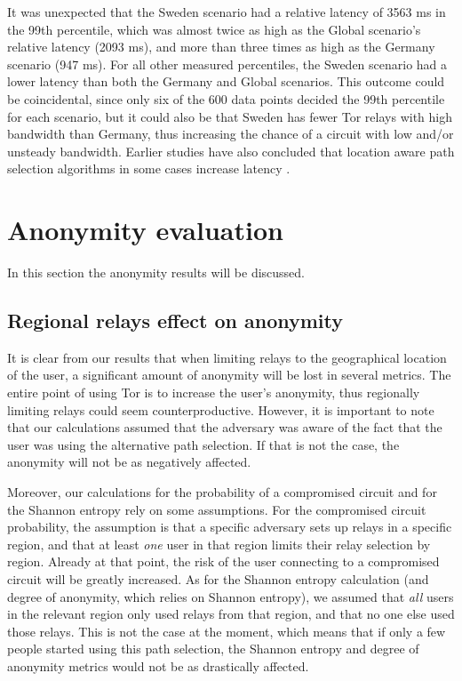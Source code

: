 \documentclass{kththesis}
\begin{document}
It was unexpected that the Sweden scenario had a relative latency of 3563 ms in the 99th percentile, which was almost twice as high as the Global scenario's relative latency (2093 ms), and more than three times as high as the Germany scenario (947 ms). For all other measured percentiles, the Sweden scenario had a lower latency than both the Germany and Global scenarios. This outcome could be coincidental, since only six of the 600 data points decided the 99th percentile for each scenario, but it could also be that Sweden has fewer Tor relays with high bandwidth than Germany, thus increasing the chance of a circuit with low and/or unsteady bandwidth. Earlier studies have also concluded that location aware path selection algorithms in some cases increase latency \parencite{CLAPS}.
 
\section{Anonymity evaluation}
\label{section:anonymityEvaluation}
In this section the anonymity results will be discussed.

\subsection{Regional relays effect on anonymity}
It is clear from our results that when limiting relays to the geographical location of the user, a significant amount of anonymity will be lost in several metrics. The entire point of using Tor is to increase the user's anonymity, thus regionally limiting relays could seem counterproductive. However, it is important to note that our calculations assumed that the adversary was aware of the fact that the user was using the alternative path selection. If that is not the case, the anonymity will not be as negatively affected.

Moreover, our calculations for the probability of a compromised circuit and for the Shannon entropy rely on some assumptions. For the compromised circuit probability, the assumption is that a specific adversary sets up relays in a specific region, and that at least \emph{one} user in that region limits their relay selection by region. Already at that point, the risk of the user connecting to a compromised circuit will be greatly increased. As for the Shannon entropy calculation (and degree of anonymity, which relies on Shannon entropy), we assumed that \emph{all} users in the relevant region only used relays from that region, and that no one else used those relays. This is not the case at the moment, which means that if only a few people started using this path selection, the Shannon entropy and degree of anonymity metrics would not be as drastically affected.
\end{document}
